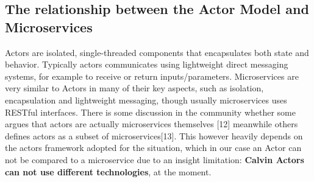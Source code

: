 \subsection{The relationship between the Actor Model and Microservices}
Actors are isolated, single-threaded components that encapsulates both state and behavior.
Typically actors communicates using lightweight direct messaging systems, for example
to receive or return inputs/parameters. Microservices are very similar to Actors in many
of their key aspects, such as isolation, encapsulation and lightweight messaging, though
usually microservices uses RESTful interfaces. There is some discussion
in the community whether some argues that actors are actually microservices
themselves [12] meanwhile others defines actors as a subset of microservices[13].
This however heavily depends on the actors framework adopted for the situation, which in our
case an Actor can not be compared to a microservice due to an insight limitation: \textbf{Calvin Actors can not
use different technologies}, at the moment.
